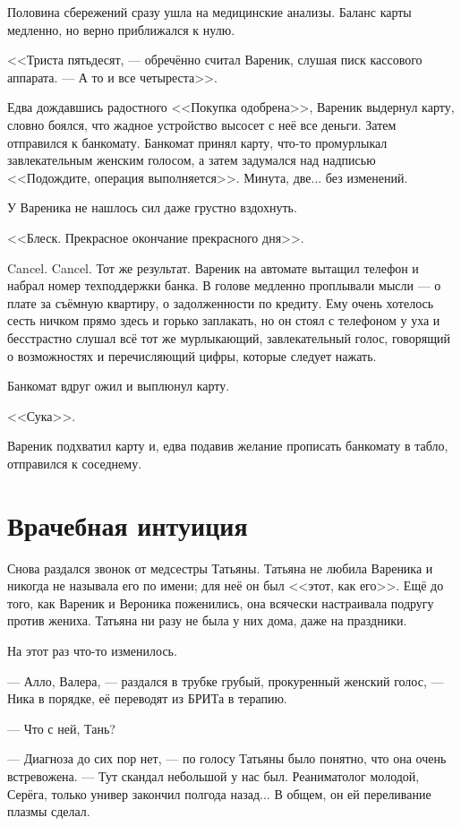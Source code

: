 \documentclass[a4paper,10pt,fleqn]{book}\usepackage{polyglossia}\setdefaultlanguage{english}\setotherlanguage{russian}\defaultfontfeatures{Ligatures=TeX,Mapping=tex-text} \usepackage{xcolor}\definecolor{lightgray}{HTML}{bbbbbb}\color{lightgray}\newcommand{\ml}[3]{\textcolor{black}{#3}}
\begin{document}
Половина сбережений сразу ушла на медицинские анализы.
Баланс карты медленно, но верно приближался к нулю.

<<Триста пятьдесят, --- обречённо считал Вареник, слушая писк кассового аппарата.
--- А то и все четыреста>>.

Едва дождавшись радостного <<Покупка одобрена>>, Вареник выдернул карту, словно боялся, что жадное устройство высосет с неё все деньги.
Затем отправился к банкомату.
Банкомат принял карту, что-то промурлыкал завлекательным женским голосом, а затем задумался над надписью <<Подождите, операция выполняется>>.
Минута, две... без изменений.

У Вареника не нашлось сил даже грустно вздохнуть.

<<Блеск.
Прекрасное окончание прекрасного дня>>.

Cancel. Cancel.
Тот же результат.
Вареник на автомате вытащил телефон и набрал номер техподдержки банка.
В голове медленно проплывали мысли --- о плате за съёмную квартиру, о задолженности по кредиту.
Ему очень хотелось сесть ничком прямо здесь и горько заплакать, но он стоял с телефоном у уха и бесстрастно слушал всё тот же мурлыкающий, завлекательный голос, говорящий о возможностях и перечисляющий цифры, которые следует нажать.

Банкомат вдруг ожил и выплюнул карту.

<<Сука>>.

Вареник подхватил карту и, едва подавив желание прописать банкомату в табло, отправился к соседнему.

\section{Врачебная интуиция}

Снова раздался звонок от медсестры Татьяны.
Татьяна не любила Вареника и никогда не называла его по имени;
для неё он был <<этот, как его>>.
Ещё до того, как Вареник и Вероника поженились, она всячески настраивала подругу против жениха.
Татьяна ни разу не была у них дома, даже на праздники.

На этот раз что-то изменилось.

--- Алло, Валера, --- раздался в трубке грубый, прокуренный женский голос, --- Ника в порядке, её переводят из БРИТа в терапию.

--- Что с ней, Тань?

--- Диагноза до сих пор нет, --- по голосу Татьяны было понятно, что она очень встревожена.
--- Тут скандал небольшой у нас был.
Реаниматолог молодой, Серёга, только универ закончил полгода назад...
В общем, он ей переливание плазмы сделал.
\end{document}
